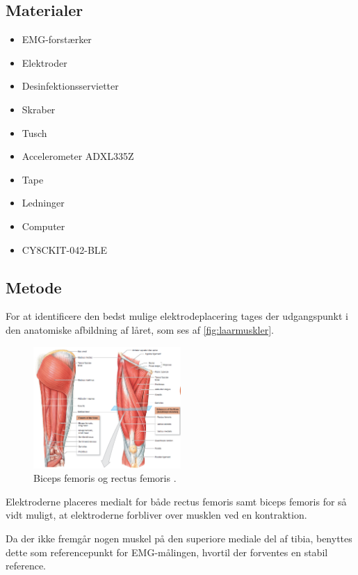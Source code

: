 \subsection{Materialer} 
\begin{itemize}
\item EMG-forstærker
\item Elektroder %
\item Desinfektionsservietter
\item Skraber
\item Tusch 
\item Accelerometer ADXL335Z
\item Tape
\item Ledninger %
\item Computer
\item CY8CKIT-042-BLE
\end{itemize}

\subsection{Metode}
For at identificere den bedst mulige elektrodeplacering tages der udgangspunkt i den anatomiske afbildning af låret, som ses af \autoref{fig:laarmuskler}.

\begin{figure}[H]
\centering
\includegraphics[width=0.5\textwidth]{figures/laarmuskler.png}
\caption{Biceps femoris og rectus femoris \citep{martini2012}.}
\label{fig:laarmuskler}
\end{figure}

Elektroderne placeres medialt for både rectus femoris samt biceps femoris for så vidt muligt, at elektroderne forbliver over musklen ved en kontraktion. 

Da der ikke fremgår nogen muskel på den superiore mediale del af tibia, benyttes dette som referencepunkt for EMG-målingen, hvortil der forventes en stabil reference. 

